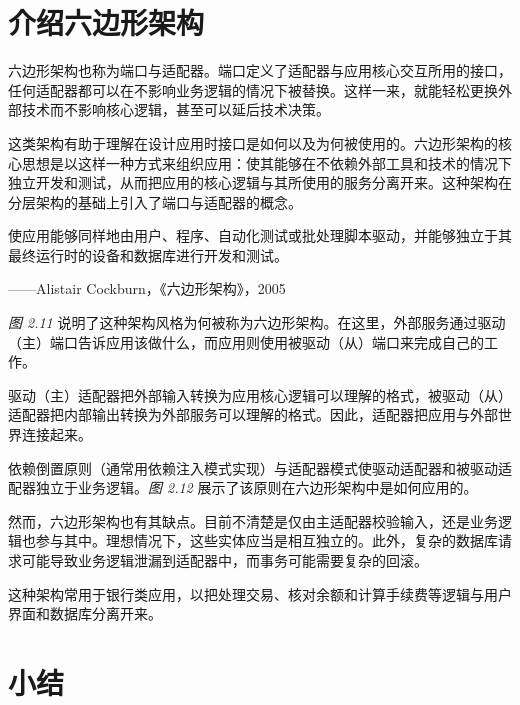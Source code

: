\section{介绍六边形架构}

\label{idx:131}
\label{idx:132}
\label{idx:133}
六边形架构也称为端口与适配器。端口定义了适配器与应用核心交互所用的接口，任何适配器都可以在不影响业务逻辑的情况下被替换。这样一来，就能轻松更换外部技术而不影响核心逻辑，甚至可以延后技术决策。

这类架构有助于理解在设计应用时接口是如何以及为何被使用的。六边形架构的核心思想是以这样一种方式来组织应用：使其能够在不依赖外部工具和技术的情况下独立开发和测试，从而把应用的核心逻辑与其所使用的服务分离开来。这种架构在分层架构的基础上引入了端口与适配器的概念。

\begin{myQuote}
使应用能够同样地由用户、程序、自动化测试或批处理脚本驱动，并能够独立于其最终运行时的设备和数据库进行开发和测试。

——Alistair Cockburn，《六边形架构》，2005

\end{myQuote}

\label{idx:134}
\emph{图 2.11} 说明了这种架构风格为何被称为六边形架构。在这里，外部服务通过驱动（主）端口告诉应用该做什么，而应用则使用被驱动（从）端口来完成自己的工作。

\label{idx:135}
驱动（主）适配器把外部输入转换为应用核心逻辑可以理解的格式，被驱动（从）适配器把内部输出转换为外部服务可以理解的格式。因此，适配器把应用与外部世界连接起来。


依赖倒置原则（通常用依赖注入模式实现）与适配器模式使驱动适配器和被驱动适配器独立于业务逻辑。\emph{图 2.12} 展示了该原则在六边形架构中是如何应用的。


\label{idx:136}
然而，六边形架构也有其缺点。目前不清楚是仅由主适配器校验输入，还是业务逻辑也参与其中。理想情况下，这些实体应当是相互独立的。此外，复杂的数据库请求可能导致业务逻辑泄漏到适配器中，而事务可能需要复杂的回滚。

这种架构常用于银行类应用，以把处理交易、核对余额和计算手续费等逻辑与用户界面和数据库分离开来。

\section{小结}

